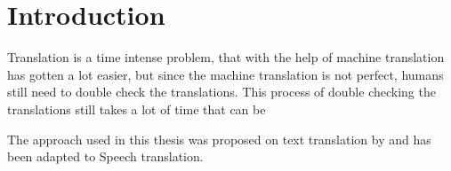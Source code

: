 
\chapter{Introduction}
\label{ch:Introduction}

Translation is a time intense problem, that with the help of machine translation has gotten a lot easier, but since the machine translation is not perfect, humans still need to double check the translations. This process of double checking the translations still takes a lot of time that can be 

The approach used in this thesis was proposed on text translation by \cite{fomicheva2020unsupervised} and has been adapted to Speech translation. 

